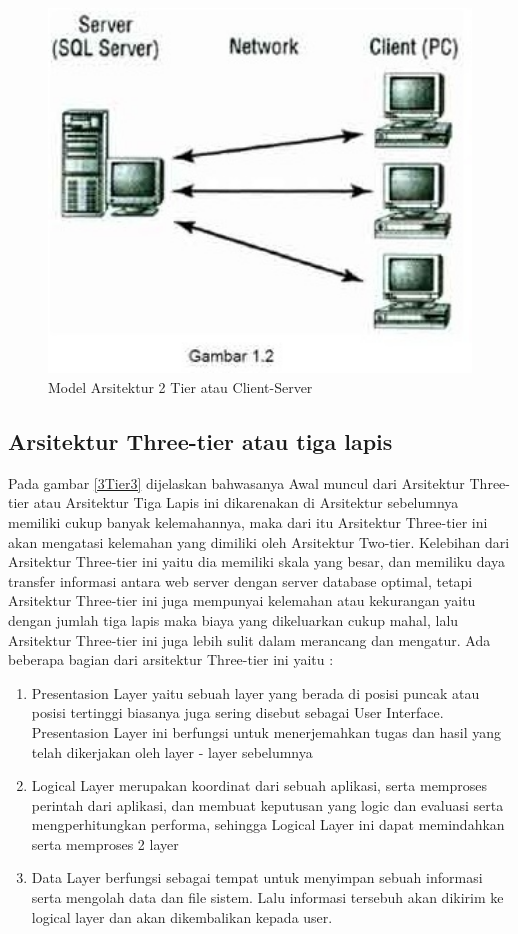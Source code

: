 {\begin{figure}[ht]
    \centerline{\includegraphics[width=1\textwidth]{figures/2model2tier}}
    \caption{Model Arsitektur 2 Tier atau Client-Server}
    \label{2Tier2}
\end{figure}

\subsection{Arsitektur Three-tier atau tiga lapis}
Pada gambar \ref{3Tier3} dijelaskan bahwasanya Awal muncul dari Arsitektur Three-tier atau Arsitektur Tiga Lapis ini dikarenakan di Arsitektur sebelumnya memiliki cukup banyak
kelemahannya, maka dari itu Arsitektur Three-tier ini akan mengatasi kelemahan yang dimiliki oleh Arsitektur Two-tier. Kelebihan
dari Arsitektur Three-tier ini yaitu dia memiliki skala yang besar, dan memiliku daya transfer informasi antara web server dengan 
server database optimal, tetapi Arsitektur Three-tier ini juga mempunyai kelemahan atau kekurangan yaitu dengan jumlah tiga lapis
maka biaya yang dikeluarkan cukup mahal, lalu Arsitektur Three-tier ini juga lebih sulit dalam merancang dan mengatur.
Ada beberapa bagian dari arsitektur Three-tier ini yaitu :
	\begin{enumerate}
		\item Presentasion Layer yaitu sebuah layer yang berada di posisi puncak atau posisi tertinggi biasanya juga sering disebut
		         sebagai User Interface. Presentasion Layer ini berfungsi untuk menerjemahkan tugas dan hasil yang telah dikerjakan
		         oleh layer - layer sebelumnya
		\item Logical Layer merupakan koordinat dari sebuah aplikasi, serta memproses perintah dari aplikasi, dan membuat
		         keputusan yang logic dan evaluasi serta mengperhitungkan performa, sehingga Logical Layer ini dapat memindahkan
		         serta memproses 2 layer
		\item Data Layer berfungsi sebagai tempat untuk menyimpan sebuah informasi serta mengolah data dan file sistem. Lalu
		         informasi tersebuh akan dikirim ke logical layer dan akan dikembalikan kepada user.
	\end{enumerate}

}
